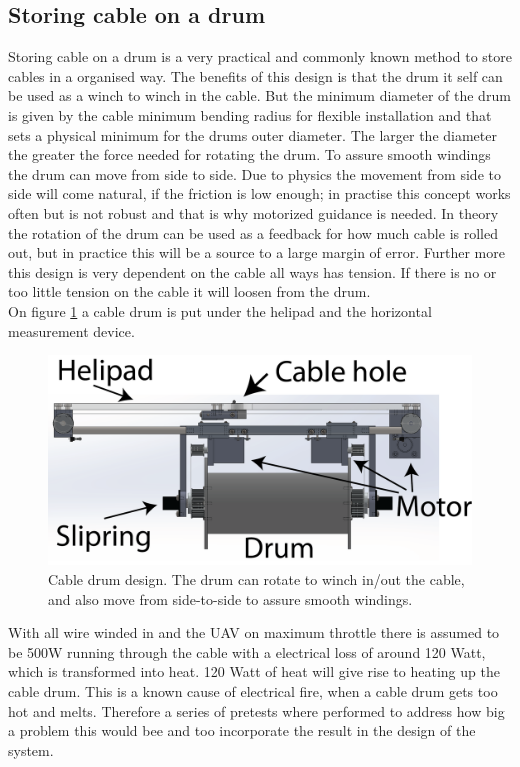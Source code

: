 \subsection{Storing cable on a drum}
Storing cable on a drum is a very practical and commonly known method to store cables in a organised way. The benefits of this design is that the drum it self can be used as a winch to winch in the cable. But the minimum diameter of the drum is given by the cable minimum bending radius for flexible installation and that sets a physical minimum for the drums outer diameter. The larger the diameter the greater the force needed for rotating the drum. To assure smooth windings the drum can move from side to side. Due to physics the movement from side to side will come natural, if the friction is low enough; in practise this concept works often but is not robust and that is why motorized guidance is needed. In theory the rotation of the drum can be used as a feedback for how much cable is rolled out, but in practice this will be a source to a large margin of error. Further more this design is very dependent on the cable all ways has tension. If there is no or too little tension on the cable it will loosen from the drum. \\
On figure \ref{fig:cable-drum} a cable drum is put under the helipad and the horizontal measurement device. 

\begin{figure}[H]
\centering
\includegraphics[scale=0.75]{graphics/cad/cable-drum.png}
\caption{Cable drum design. The drum can rotate to winch in/out the cable, and also move from side-to-side to assure smooth windings.}
\label{fig:cable-drum}
\end{figure}

\noindent
With all wire winded in and the UAV on maximum throttle there is assumed to be 500W running through the cable with a electrical loss of around 120 Watt, which is transformed into heat. 120 Watt of heat will give rise to heating up the cable drum. This is a known cause of electrical fire, when a cable drum gets too hot and melts. Therefore a series of pretests where performed to address how big a problem this would bee and too incorporate the result in the design of the system. 

